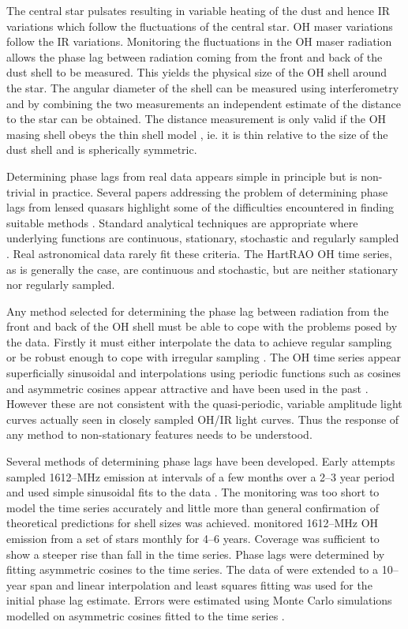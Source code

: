 \documentclass[usenatbib,usegraphicx]{mn2e}
\begin{document}
The central star pulsates resulting in variable heating of the dust and
hence IR variations which follow the fluctuations of the central star.  OH
maser variations follow the IR variations.  Monitoring the fluctuations in
the OH maser radiation allows the phase lag between radiation coming from
the front and back of the dust shell to be measured.  This yields the
physical size of the OH shell around the star.  The angular diameter of the
shell can be measured using interferometry and by combining the two
measurements an independent estimate of the distance to the star can be
obtained.  The distance measurement is only valid if the OH masing shell
obeys the thin shell model \citep[][review]{ReidMMJS77,RJC89}, ie. it is
thin relative to the size of the dust shell and is spherically symmetric.

Determining phase lags from real data appears simple in principle but is
non-trivial in practice.  Several papers addressing the problem of
determining phase lags from lensed quasars highlight some of the
difficulties encountered in finding suitable methods
\citep[eg.][]{PhLGil-M02,PhLOscoz01,PhLPelt96,PhLPress92,EK88}. 
Standard analytical techniques are appropriate where underlying functions
are continuous, stationary, stochastic and regularly sampled
\citep{Welsh99,EK88}.  Real astronomical data rarely fit these criteria. 
The HartRAO OH time series, as is generally the case, are continuous and
stochastic, but are neither stationary nor regularly sampled.

Any method selected for determining the phase lag between radiation from the
front and back of the OH shell must be able to cope with the problems posed
by the data.  Firstly it must either interpolate the data to achieve regular
sampling or be robust enough to cope with irregular sampling \citep{EK88}. 
The OH time series appear superficially sinusoidal and interpolations using
periodic functions such as cosines and asymmetric cosines appear attractive
and have been used in the past \citep[eg.][]{SchSherWin78,HerHab85}. 
However these are not consistent with the quasi-periodic, variable amplitude
light curves actually seen in closely sampled OH/IR light curves.  Thus the
response of any method to non-stationary features needs to be understood.

Several methods of determining phase lags have been developed.  Early
attempts sampled 1612--MHz emission at intervals of a few months over a 2--3
year period and used simple sinusoidal fits to the data
\citep{SchSherWin78,Jewell79,JewWebSny80}.  The monitoring was too short to
model the time series accurately and little more than general confirmation
of theoretical predictions for shell sizes was achieved.  \citet{Herman83}
monitored 1612--MHz OH emission from a set of stars monthly for 4--6 years. 
Coverage was sufficient to show a steeper rise than fall in the time series. 
Phase lags were determined by fitting asymmetric cosines to the time series. 
The data of \citet{HerHab85} were extended to a 10--year span and linear
interpolation and least squares fitting was used for the initial phase lag
estimate.  Errors were estimated using Monte Carlo simulations modelled on
asymmetric cosines fitted to the time series
\citep{vLvdHvS90,vanLangevelde92}.
\end{document}
